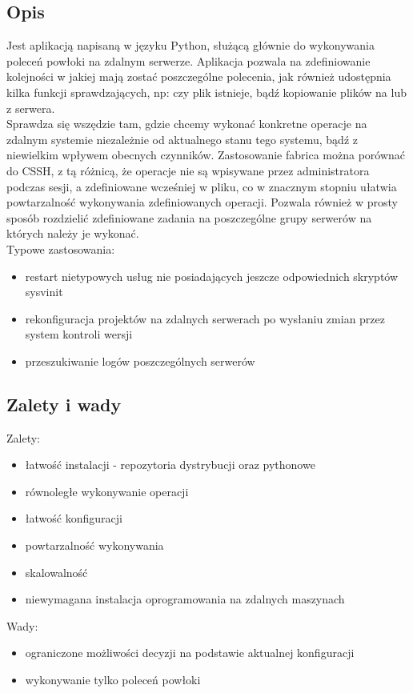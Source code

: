 \subsection{Opis}
Jest aplikacją napisaną w języku Python, służącą głównie do wykonywania poleceń powłoki na zdalnym serwerze. Aplikacja pozwala na zdefiniowanie kolejności w jakiej mają zostać poszczególne polecenia, jak również udostępnia kilka funkcji sprawdzających, np: czy plik istnieje, bądź kopiowanie plików na lub z serwera.\\
Sprawdza się wszędzie tam, gdzie chcemy wykonać konkretne operacje na zdalnym systemie niezależnie od aktualnego stanu tego systemu, bądź z niewielkim wpływem obecnych czynników.
Zastosowanie fabrica można porównać do CSSH, z tą różnicą, że operacje nie są wpisywane przez administratora podczas sesji, a zdefiniowane wcześniej w pliku, co w znacznym stopniu ułatwia powtarzalność wykonywania zdefiniowanych operacji.
Pozwala również w prosty sposób rozdzielić zdefiniowane zadania na poszczególne grupy serwerów na których należy je wykonać.\\
Typowe zastosowania:
\begin{itemize}
\item restart nietypowych usług nie posiadających jeszcze odpowiednich skryptów sysvinit
\item rekonfiguracja projektów na zdalnych serwerach po wysłaniu zmian przez system kontroli wersji
\item przeszukiwanie logów poszczególnych serwerów
\end{itemize}
\subsection{Zalety i wady}
Zalety:
\begin{itemize}
\item łatwość instalacji - repozytoria dystrybucji oraz pythonowe
\item równoległe wykonywanie operacji
\item łatwość konfiguracji
\item powtarzalność wykonywania
\item skalowalność
\item niewymagana instalacja oprogramowania na zdalnych maszynach
\end{itemize}
Wady:
\begin{itemize}
\item ograniczone możliwości decyzji na podstawie aktualnej konfiguracji
\item wykonywanie tylko poleceń powłoki
\end{itemize}
